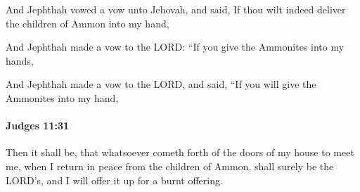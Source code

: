 			\begin{versebox}
					\item[BHS] 
					\item[ASV] And Jephthah vowed a vow unto Jehovah, and said, If thou wilt indeed deliver the children of Ammon into my hand,
					\item[NIV] And Jephthah made a vow to the LORD: “If you give the Ammonites into my hands,
					\item[NRSV] And Jephthah made a vow to the LORD, and said, “If you will give the Ammonites into my hand,
			\end{versebox}

		\paragraph{Judges 11:31} %
			\label{JUDGES-11-31}

			Then it shall be, that whatsoever cometh forth of the doors of my house to meet me, when I return in peace from the children of Ammon, shall surely be the LORD’s, and I will offer it up for a burnt offering.

